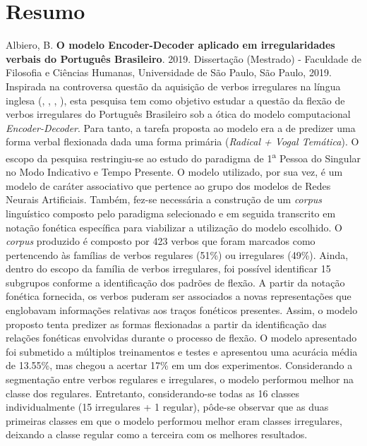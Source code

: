 \documentclass[12pt,twoside,a4paper]{book}
\newcommand{\aup}{\textsuperscript}
\begin{document}
\chapter*{Resumo}
\noindent Albiero, B. \textbf{O modelo Encoder-Decoder aplicado em irregularidades verbais do Português Brasileiro}. 
2019.
Dissertação (Mestrado) - Faculdade de Filosofia e Ciências Humanas,
Universidade de São Paulo, São Paulo, 2019.
\\

Inspirada na controversa questão da aquisição de verbos irregulares na língua inglesa (\cite{chomsky:1968},  \cite{Pinker:1988},
\cite{Albright2003RulesVA}, \cite{kirov:2018}), esta pesquisa tem como objetivo estudar a questão da flexão de verbos irregulares do Português Brasileiro sob a ótica do modelo computacional \textit{Encoder-Decoder}. Para tanto, a tarefa proposta ao modelo era a de predizer uma forma verbal flexionada dada uma forma primária (\textit{Radical + Vogal Temática}). O escopo da pesquisa restringiu-se ao estudo do paradigma de 1\aup{a} Pessoa do Singular no Modo Indicativo e Tempo Presente. O modelo utilizado, por sua vez, é um modelo de caráter associativo que pertence ao grupo dos modelos de Redes Neurais Artificiais. Também, fez-se necessária a construção de um \textit{corpus} linguístico composto pelo paradigma selecionado e em seguida transcrito em notação fonética específica para viabilizar a utilização do modelo escolhido. O \textit{corpus} produzido é composto por 423 verbos que foram marcados como pertencendo às famílias de verbos regulares (51\%) ou irregulares (49\%). Ainda, dentro do escopo da família de verbos irregulares, foi possível identificar 15 subgrupos conforme a identificação dos padrões de flexão. A partir da notação fonética fornecida, os verbos puderam ser associados a novas representações que englobavam informações relativas aos traços fonéticos presentes. Assim, o modelo proposto tenta predizer as formas flexionadas a partir da identificação das relações fonéticas envolvidas durante o processo de flexão. O modelo apresentado foi submetido a múltiplos treinamentos e testes e apresentou uma acurácia média de 13.55\%, mas chegou a acertar 17\% em um dos experimentos. Considerando a segmentação entre verbos regulares e irregulares, o modelo performou melhor na classe dos regulares. Entretanto, considerando-se todas as 16 classes individualmente (15 irregulares + 1 regular), pôde-se observar que as duas primeiras classes em que o modelo performou melhor eram classes irregulares, deixando a classe regular como a terceira com os melhores resultados.
\end{document}
